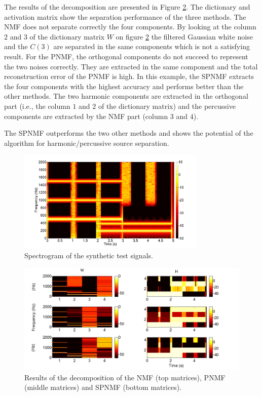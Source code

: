 \documentclass[journal]{IEEEtran}
\begin{document}
The results of the decomposition are presented in Figure \ref{resultONMF2}. The dictionary and activation matrix show the separation performance of the three methods. The NMF does not separate correctly the four components. By looking at the column $2$ and $3$ of the dictionary matrix $W$ on figure \ref{resultONMF2} the filtered Gaussian white noise and the $C(3)$ are separated in the same components which is not a satisfying result.
For the PNMF, the orthogonal components do not succeed to represent the two noises correctly. They are extracted in the same component and the total reconstruction error of the PNMF is high.
In this example, the SPNMF extracts the four components with the highest accuracy and performs better than the other methods. The two harmonic components are extracted in the orthogonal part (i.e., the column $1$ and $2$ of the dictionary matrix) and the percussive components are extracted by the NMF part (column $3$ and $4$).

The SPNMF outperforms the two other methods and shows the potential of the algorithm for harmonic/percussive source separation.
%

\begin{figure}[htb]

  \centering 
  \includegraphics[width=9cm]{fig/synthetictestspectrogram.png}
  \caption{\label{SpectroSynth} Spectrogram of the synthetic test signals.}
  
\end{figure}

\begin{figure}
   
	\centering    
  \includegraphics[width=15cm]{fig/WHcomp.png}

\caption{\label{resultONMF2} Results of the decomposition of the NMF (top matrices), PNMF (middle matrices) and SPNMF (bottom matrices).}


\end{figure}
\end{document}
